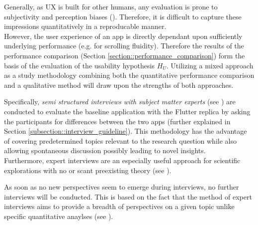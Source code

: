 Generally, as UX is built for other humans, any evaluation is prone to subjectivity and perception
biases (\cite{Tversky1974}). Therefore, it is difficult to capture these impressions quantitatively in a reproducable manner.\\
However, the user experience of an app is directly dependant upon sufficiently underlying performance (e.g. for scrolling
fluidity). Therefore the results of the performance comparison (Section \ref{section::performance_comparison}) form the basis of the evaluation of the usability hypothesis $H_U$.
Utilizing a mixed approach as a study methodology combining both the quantitative performance comparison and a qualitative method will draw upon the strengths of both approaches. 

Specifically, \textit{semi structured interviews with subject matter experts} (see \cite{Liebold2009}) are conducted to evaluate the baseline application
with the Flutter replica by asking the participants for differences between the two apps (further explained in Section \ref{subsection::interview_guideline}). This methodology has the
advantage of covering predetermined topics relevant to the research question while also allowing spontaneous discussion possibly leading to novel insights.\\
Furthermore, expert interviews are an especially useful approach for scientific explorations
with no or scant preexisting theory (see \cite{Experts2009}).

As soon as no new perspectives seem to emerge during interviews, no further interviews will be conducted.
This is based on the fact that the method of expert interviews 
aims to provide a breadth of perspectives on a given topic unlike specific quantitative anaylses (see \cite{Liebold2009}).


